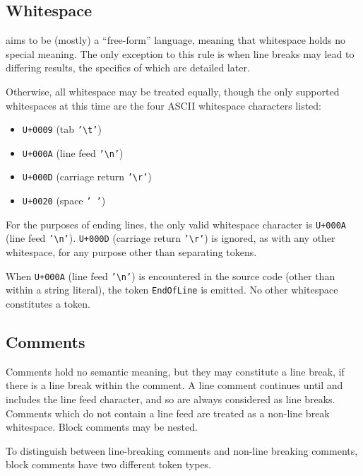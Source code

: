 \subsection{Whitespace}

\Trilogy{} aims to be (mostly) a ``free-form'' language, meaning that
whitespace holds no special meaning. The only exception to this rule
is when line breaks may lead to differing results, the specifics of which
are detailed later.

Otherwise, all whitespace may be treated equally, though the only supported
whitespaces at this time are the four ASCII whitespace characters listed:

\begin{itemize}
    \item \texttt{U+0009} (tab \texttt{'\textbackslash t'})
    \item \texttt{U+000A} (line feed \texttt{'\textbackslash n'})
    \item \texttt{U+000D} (carriage return \texttt{'\textbackslash r'})
    \item \texttt{U+0020} (space \texttt{' '})
\end{itemize}

For the purposes of ending lines, the only valid whitespace character is
\texttt{U+000A} (line feed \texttt{'\textbackslash n'}).
\texttt{U+000D} (carriage return \texttt{'\textbackslash r'}) is ignored,
as with any other whitespace, for any purpose other than separating tokens.

When \texttt{U+000A} (line feed \texttt{'\textbackslash n'}) is encountered
in the source code (other than within a string literal), the token
\texttt{EndOfLine} is emitted. No other whitespace constitutes a token.

\subsection{Comments}

Comments hold no semantic meaning, but they may constitute a line break,
if there is a line break within the comment. A line comment continues until and
includes the line feed character, and so are always considered as line breaks.
Comments which do not contain a line feed are treated as a non-line
break whitespace. Block comments may be nested.

To distinguish between line-breaking comments and non-line breaking comments,
block comments have two different token types.

